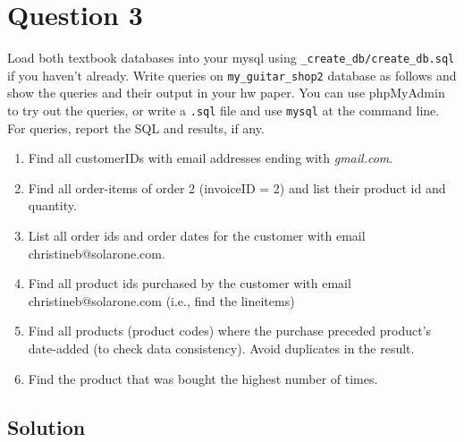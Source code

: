 
\section*{Question 3}

Load both textbook databases into your mysql using \texttt{\_create\_db/create\_db.sql} if you haven't already.
Write queries on \texttt{my\_guitar\_shop2} database as follows and show the queries and their output in your hw paper.
You can use phpMyAdmin to try out the queries, or write a \texttt{.sql} file and use \texttt{mysql} at the command line.
For queries, report the SQL and results, if any.

\begin{enumerate}[label=(\alph*)]
\item Find all customerIDs with email addresses ending with \textit{gmail.com}.
\item Find all order-items of order 2 (invoiceID = 2) and list their product id and quantity.
\item List all order ids and order dates for the customer with email christineb@solarone.com.
\item Find all product ids purchased by the customer with email christineb@solarone.com (i.e., find the lineitems)
\item Find all products (product codes) where the purchase preceded product’s date-added (to check data consistency).
Avoid duplicates in the result.
\item Find the product that was bought the highest number of times.
\end{enumerate}

\subsection*{Solution}

